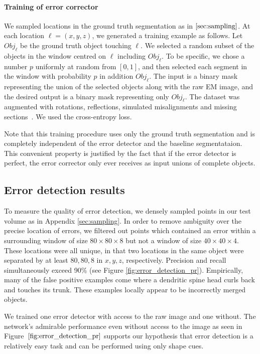 \documentclass{article}
\begin{document}
\paragraph{Training of error corrector}
We sampled locations in the ground truth segmentation as in $\ref{sec:sampling}$. At each location $\ell = (x,y,z)$, we generated a training example as follows. Let $Obj_\ell$ be the ground truth object touching $\ell$. We selected a random subset of the objects in the window centred on $\ell$ including $Obj_\ell$. To be specific, we chose a number $p$ uniformly at random from $[0,1]$, and then selected each segment in the window with probability $p$ in addition $Obj_\ell$. The input is a binary mask representing the union of the selected objects along with the raw EM image, and the desired output is a binary mask representing only $Obj_\ell$. The dataset was augmented with rotations, reflections, simulated misalignments and missing sections~\cite{kisuk}. We used the cross-entropy loss.

Note that this training procedure uses only the ground truth segmentation and is completely independent of the error detector and the baseline segmentataion. This convenient property is justified by the fact that if the error detector is perfect, the error corrector only ever receives as input unions of complete objects.

\subsection{Error detection results}
\label{sec:detection_results}
To measure the quality of error detection, we densely sampled points in our test volume as in Appendix \ref{sec:sampling}. In order to remove ambiguity over the precise location of errors, we filtered out points which contained an error within a surrounding window of size $80\times80\times 8$ but not a window of size $40\times 40 \times 4$. These locations were all unique, in that two locations in the same object were separated by at least $80,80,8$ in $x,y,z$, respectively. Precision and recall simultaneously exceed 90\% (see Figure \ref{fig:error_detection_pr}). Empirically, many of the false positive examples come where a dendritic spine head curls back and touches its trunk. These examples locally appear to be incorrectly merged objects.

We trained one error detector with access to the raw image and one without. The network's admirable performance even without access to the image as seen in Figure~$\ref{fig:error_detection_pr}$ supports our hypothesis that error detection is a relatively easy task and can be performed using only shape cues.
\end{document}
